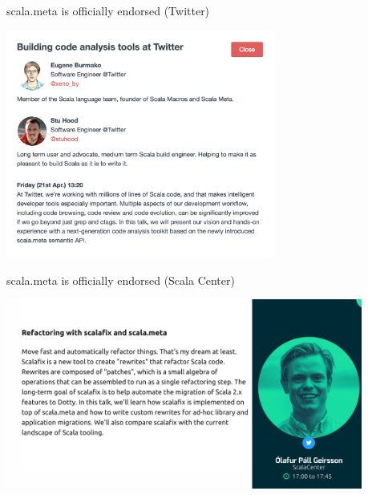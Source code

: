 \documentclass[svgnames,dvipsnames,hyperref={bookmarks=false},usepdftitle=false]{beamer}
\begin{document}
\begin{frame}{scala.meta is officially endorsed (Twitter)}
\vskip20pt
\begin{center}
\includegraphics[height=7.5cm]{is-officially-endorsed-2.png}
\end{center}
\end{frame}

\begin{frame}{scala.meta is officially endorsed (Scala Center)}
\vskip20pt
\begin{center}
\includegraphics[height=6.25cm]{is-officially-endorsed-3.png}
\end{center}
\end{frame}

\end{document}
